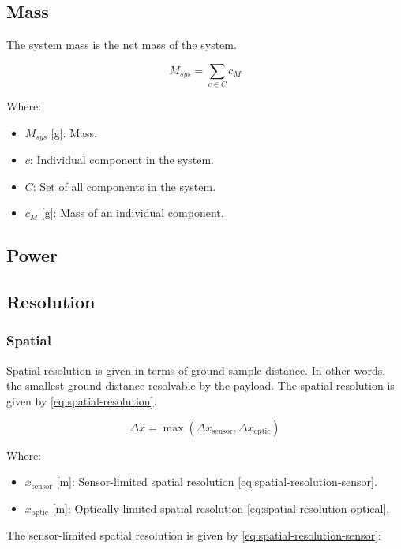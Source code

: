 \documentclass{article}
\begin{document}
\subsection{Mass}
The system mass is the net mass of the system.

\begin{equation}
    M_{sys} = \sum_{c \in C} c_M
\end{equation}

Where:
\begin{itemize}[label={}]
    \item $M_{sys}$ [\si{\g}]: Mass.
    \item $c$: Individual component in the system.
    \item $C$: Set of all components in the system.
    \item $c_{M}$ [\si{\g}]: Mass of an individual component.
\end{itemize}

\subsection{Power}

\subsection{Resolution}

\subsubsection{Spatial}
Spatial resolution is given in terms of ground sample distance. In other words, the smallest ground distance resolvable by the payload. The spatial resolution is given by \eqref{eq:spatial-resolution}.

\begin{equation} \label{eq:spatial-resolution}
    \Delta x = \max\left( \Delta x_{\text{sensor}}, \Delta x_{\text{optic}} \right)
\end{equation}

Where:
\begin{itemize}[label={}]
    \item $x_{\text{sensor}}$ [\si{\m}]: Sensor-limited spatial resolution \eqref{eq:spatial-resolution-sensor}.
    \item $x_{\text{optic}}$ [\si{\m}]: Optically-limited spatial resolution \eqref{eq:spatial-resolution-optical}.
\end{itemize}

The sensor-limited spatial resolution is given by \eqref{eq:spatial-resolution-sensor}:
\end{document}
